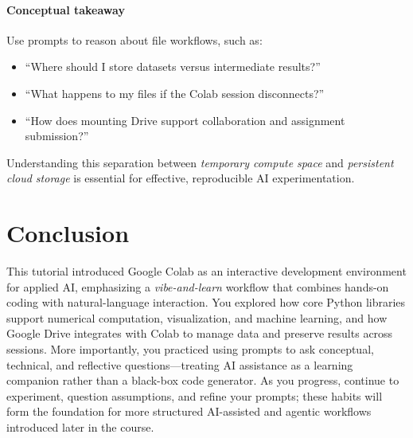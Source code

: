 \documentclass[12pt]{article}
\begin{document}
\paragraph{Conceptual takeaway}
Use prompts to reason about file workflows, such as:
\begin{itemize}
  \item ``Where should I store datasets versus intermediate results?''
  \item ``What happens to my files if the Colab session disconnects?''
  \item ``How does mounting Drive support collaboration and assignment submission?''
\end{itemize}

Understanding this separation between \emph{temporary compute space} and \emph{persistent cloud storage} is essential for effective, reproducible AI experimentation.

\section*{Conclusion}

This tutorial introduced Google Colab as an interactive development environment for applied AI, emphasizing a \emph{vibe-and-learn} workflow that combines hands-on coding with natural-language interaction. You explored how core Python libraries support numerical computation, visualization, and machine learning, and how Google Drive integrates with Colab to manage data and preserve results across sessions. More importantly, you practiced using prompts to ask conceptual, technical, and reflective questions—treating AI assistance as a learning companion rather than a black-box code generator. As you progress, continue to experiment, question assumptions, and refine your prompts; these habits will form the foundation for more structured AI-assisted and agentic workflows introduced later in the course.
\end{document}
